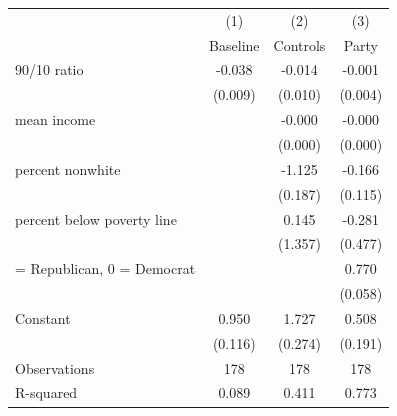 \begin{tabular}{lccc}
\toprule
                    &\multicolumn{1}{c}{(1)}&\multicolumn{1}{c}{(2)}&\multicolumn{1}{c}{(3)}\\
                    &\multicolumn{1}{c}{Baseline}&\multicolumn{1}{c}{Controls}&\multicolumn{1}{c}{Party}\\
\midrule
90/10 ratio         &      -0.038\sym{***}&      -0.014         &      -0.001         \\
                    &     (0.009)         &     (0.010)         &     (0.004)         \\
\addlinespace
mean income         &                     &      -0.000\sym{***}&      -0.000\sym{**} \\
                    &                     &     (0.000)         &     (0.000)         \\
\addlinespace
percent nonwhite    &                     &      -1.125\sym{***}&      -0.166         \\
                    &                     &     (0.187)         &     (0.115)         \\
\addlinespace
percent below poverty line&                     &       0.145         &      -0.281         \\
                    &                     &     (1.357)         &     (0.477)         \\
\addlinespace
1 = Republican, 0 = Democrat&                     &                     &       0.770\sym{***}\\
                    &                     &                     &     (0.058)         \\
\addlinespace
Constant            &       0.950\sym{***}&       1.727\sym{***}&       0.508\sym{***}\\
                    &     (0.116)         &     (0.274)         &     (0.191)         \\
\midrule
Observations        &         178         &         178         &         178         \\
R-squared           &       0.089         &       0.411         &       0.773         \\
\bottomrule
\end{tabular}
